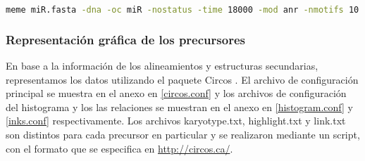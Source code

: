 \begin{lstlisting}[language=bash]
meme miR.fasta -dna -oc miR -nostatus -time 18000 -mod anr -nmotifs 10 -minw 5 -maxw 50 -revcomp -evt 1e-3
\end{lstlisting}

\subsubsection{Representación gráfica de los precursores}
En base a la información de los alineamientos y estructuras secundarias, representamos los datos utilizando el paquete Circos \citep{pmid19541911}.
El archivo de configuración principal se muestra en el anexo en \ref{circos.conf} y los archivos de configuración del histograma y los las relaciones se muestran en el anexo en \ref{histogram.conf} y \ref{inks.conf} respectivamente. 
Los archivos karyotype.txt, highlight.txt y link.txt son distintos para cada precursor en particular y se realizaron mediante un script, con el formato que se especifica en \url{http://circos.ca/}.
